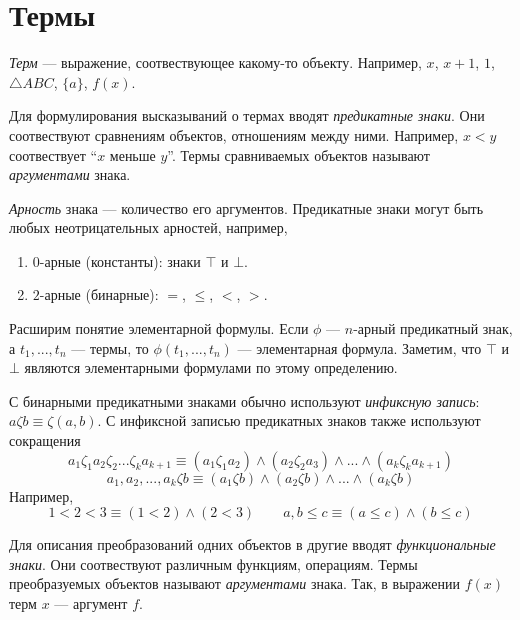 \section{Термы}

 {\it Терм} --- выражение, соотвествующее какому-то объекту.
Например, $x$, $x+1$, $1$, $\triangle ABC$, $\{a\}$, $f(x)$.

Для формулирования высказываний о термах вводят
{\it предикатные знаки}.
Они соотвествуют сравнениям объектов, отношениям между ними.
Например, $x<y$ соотвествует ``$x$ меньше $y$''.
Термы сравниваемых объектов называют {\it аргументами} знака.

{\it Арность}
знака --- количество его аргументов.
Предикатные знаки могут быть любых неотрицательных арностей, например,
\begin{enumerate}
  \item{}$0$-арные (константы): знаки $\top$ и $\bot$.
  \item{}$2$-арные (бинарные): $=$, $\leq$, $<$, $>$.
\end{enumerate}

Расширим понятие элементарной формулы. Если $\phi$ --- $n$-арный предикатный знак,
а $t_1,...,t_{n}$ --- термы, то $\phi(t_1,...,t_{n})$ --- элементарная формула.
Заметим, что $\top$ и $\bot$ являются элементарными формулами по этому
определению.

С бинарными предикатными знаками обычно используют {\it инфиксную запись}:
$a\zeta b\equiv \zeta(a,b)$. С инфиксной записью предикатных знаков
также используют сокращения
\[
  a_{1}\zeta_{1}a_{2}\zeta_{2}...\zeta_{k}a_{k+1}\equiv
  (a_1\zeta_1 a_2)\land (a_2\zeta_2 a_3)\land ... \land (a_{k}\zeta_{k}a_{k+1})
\]
\[
  a_1,a_2,...,a_{k}\zeta b\equiv (a_1\zeta b)\land (a_2\zeta b)\land ...
  \land (a_{k}\zeta b)
\]
Например,
\[
  1<2<3\equiv (1<2)\land (2<3)\qquad a,b\leq c\equiv (a\leq c)\land (b\leq c)
\]

\pagebreak

Для описания преобразований одних объектов
в другие вводят {\it функциональные знаки}.
Они соотвествуют различным функциям, операциям.
Термы преобразуемых объектов называют {\it аргументами} знака.
Так, в выражении $f(x)$ терм $x$ --- аргумент $f$.

